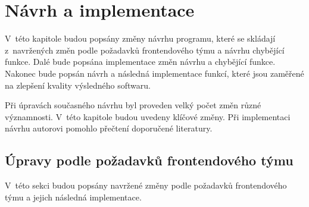 \chapter{Návrh a implementace}\label{chapter:navrh}
V~této kapitole budou popsány změny návrhu programu, které se skládají z~navržených změn podle požadavků frontendového týmu a návrhu chybějící funkce. Dalé bude popsána implementace změn návrhu a chybějící funkce. Nakonec bude popsán návrh a následná implementace funkcí, které jsou zaměřené na zlepšení kvality výsledného softwaru.

Při úpravách současného návrhu byl proveden  velký počet změn různé významnosti. V~této kapitole budou uvedeny klíčové změny. Při implementaci návrhu autorovi pomohlo přečtení doporučené literatury.\cite{pro-spring-boot-2}

\section{Úpravy podle požadavků frontendového týmu}\label{navrh:upravy}
    V~této sekci budou popsány navržené změny podle požadavků frontendového týmu a jejich následná implementace.
    
